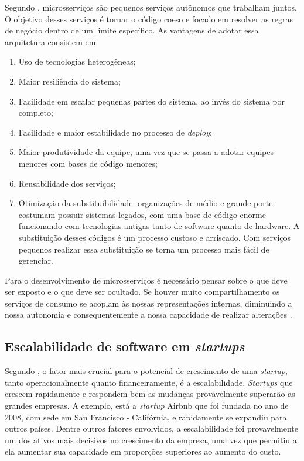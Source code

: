 Segundo , microsserviços são pequenos serviços autônomos que
trabalham juntos. O objetivo desses serviços é tornar o código coeso e focado em
resolver as regras de negócio dentro de um limite específico. As vantagens de adotar
essa arquitetura consistem em:

\begin{enumerate}
    \item{Uso de tecnologias heterogêneas;}
    \item{Maior resiliência do sistema;}
    \item{Facilidade em escalar pequenas partes do sistema, ao invés do sistema por
    completo;}
    \item{Facilidade e maior estabilidade no processo de \textit{deploy};}
    \item{Maior produtividade da equipe, uma vez que se passa a adotar equipes
    menores com bases de código menores;}
    \item{Reusabilidade dos serviços;}
    \item{Otimização da substituibilidade: organizações de médio e grande porte costumam
    possuir sistemas legados, com uma base de código enorme funcionando com tecnologias
    antigas tanto de software quanto de hardware. A substituição desses códigos é um
    processo custoso e arriscado. Com serviços pequenos realizar essa substituição
    se torna um processo mais fácil de gerenciar.}
\end{enumerate}

Para o desenvolvimento de microsserviços é necessário pensar sobre o que deve ser
exposto e o que deve ser ocultado. Se houver muito compartilhamento os serviços de
consumo se acoplam às nossas representações internas, diminuindo a nossa autonomia
e consequentemente a nossa capacidade de realizar alterações \cite{Newman2015}.

\subsection{Escalabilidade de software em \textit{startups}}

Segundo , o fator mais crucial para o potencial
de crescimento de uma \textit{startup}, tanto operacionalmente quanto financeiramente,
é a escalabilidade. \textit{Startups} que crescem rapidamente e respondem bem as
mudanças provavelmente superarão as grandes empresas. A exemplo, está a \textit{startup}
Airbnb que foi fundada no ano de 2008, com sede em San Francisco - Califórnia, e
rapidamente se expandiu para outros países. Dentre outros fatores envolvidos, a
escalabilidade foi provavelmente um dos ativos mais decisivos no crescimento da
empresa, uma vez que permitiu a ela aumentar sua capacidade em proporções superiores
ao aumento do custo.

